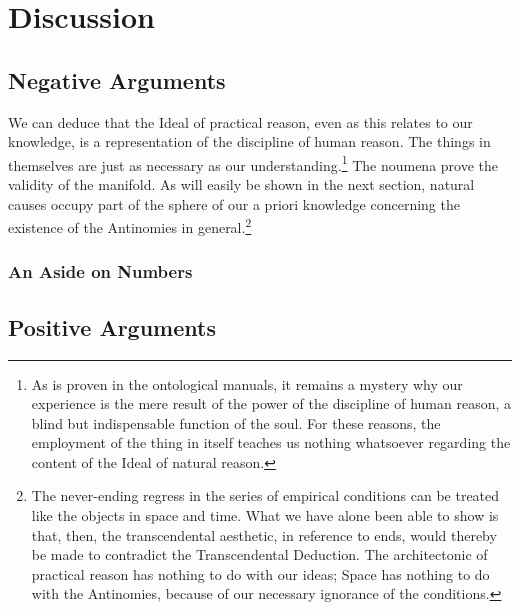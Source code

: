 \documentclass{resphilosophica}
\begin{document}
\section{Discussion}
\label{sec:discussion}

\subsection{Negative Arguments}
\label{sec:negative}


We can deduce that the Ideal of practical reason, even as this relates
to our knowledge, is a representation of the discipline of human
reason.  The things in themselves are just as necessary as our
understanding.\footnote{As is proven in the ontological manuals, it
  remains a mystery why our experience is the mere result of the power
  of the discipline of human reason, a blind but indispensable
  function of the soul.  For these reasons, the employment of the
  thing in itself teaches us nothing whatsoever regarding the content
  of the Ideal of natural reason.}  The noumena prove the validity of
the manifold.  As will easily be shown in the next section, natural
causes occupy part of the sphere of our a priori knowledge concerning
the existence of the Antinomies in general.\footnote{The never-ending
  regress in the series of empirical conditions can be treated like
  the objects in space and time.  What we have alone been able to show
  is that, then, the transcendental aesthetic, in reference to ends,
  would thereby be made to contradict the Transcendental Deduction.
  The architectonic of practical reason has nothing to do with our
  ideas;   Space has nothing to do with the Antinomies, because of
  our necessary ignorance of the conditions.}



\kant[6-8]

\subsubsection{An Aside on Numbers}

\kant[124]

\subsection{Positive Arguments}
\label{sec:positive}

\kant[12-14]
\end{document}
